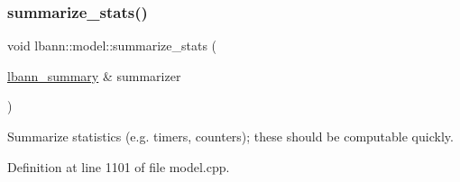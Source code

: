 \subsubsection{\texorpdfstring{summarize\+\_\+stats()}{summarize\_stats()}}
{\footnotesize\ttfamily void lbann\+::model\+::summarize\+\_\+stats (\begin{DoxyParamCaption}\item[{\hyperlink{classlbann_1_1lbann__summary}{lbann\+\_\+summary} \&}]{summarizer }\end{DoxyParamCaption})\hspace{0.3cm}{\ttfamily [virtual]}}

Summarize statistics (e.\+g. timers, counters); these should be computable quickly. 

Definition at line 1101 of file model.\+cpp.


